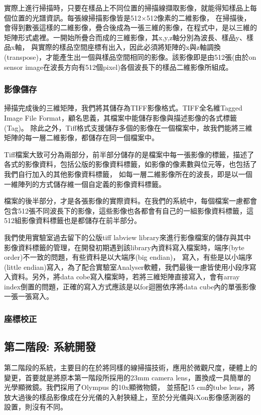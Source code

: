 \documentclass[12pt]{article}
\begin{document}
    實際上進行掃描時，只要在樣品上不同位置的掃描線擷取影像，就能得知樣品上每個位置的光譜資訊。每張線掃描影像皆是512$\times$512像素的二維影像，
    在掃描後，會得到數張這樣的二維影像，疊合後成為一張三維的影像，在程式中，是以三維的矩陣形式處裡。一開始所疊合而成的三維影像，其x,y,z軸分別為波長、樣品y、樣品x軸，
    與實際的樣品空間座標有出入，因此必須將矩陣的x與z軸調換(transpose)，才能產生出一個與樣品空間相同的影像。該影像即是由512張(由於on sensor image在波長方向有512個pixel)各個波長下的樣品二維影像所組成。

    \subsubsection{影像儲存}\label{section: saveTiff}
    掃描完成後的三維矩陣，我們將其儲存為TIFF影像格式。TIFF全名維Tagged Image File Format，顧名思義，其檔案中能儲存影像與描述影像的各式標籤(Tag)。
    除此之外，Tiff格式支援儲存多個的影像在一個檔案中，故我們能將三維矩陣的每一層二維影像，都儲存在同一個檔案中。

    Tiff檔案大致可分為兩部分，前半部分儲存的是檔案中每一張影像的標籤，描述了各式的影像資料，包括公版的影像資料標籤，如影像的像素數與位元等，也包括了我們自行加入的其他影像資料標籤，
    如每一層二維影像所在的波長，即是以一個一維陣列的方式儲存維一個自定義的影像資料標籤。

    檔案的後半部分，才是各張影像的實際資料。在我們的系統中，每個檔案一慮都會包含512張不同波長下的影像，這些影像也各都會有自己的一組影像資料標籤，這512組影像資料標籤也是都儲存在前半部分。

    我們使用實驗室過去留下的公版tiff labview library來進行影像檔案的儲存與其中影像資料標籤的管理，在開發初期遇到該library內資料寫入檔案時，端序(byte order)不一致的問題，有些資料是以大端序(big endian)，
    寫入，有些是以小端序(little endian)寫入，為了配合實驗室Analyser軟體，我們最後一慮皆使用小段序寫入資料。另外，將data cobe寫入檔案時，若將三維矩陣直接寫入，會有array index倒置的問題，正確的寫入方式應該是以for迴圈依序將data cube內的單張影像一張一張寫入。

    
    \subsubsection{座標校正}

    \subsection{第二階段: 系統開發}
    第二階段的系統，主要目的在於將同樣的線掃描技術，應用於微觀尺度，硬體上的變更，首要就是將原本第一階段所採用的23mm camera lens，置換成一具簡單的光學顯微鏡。我們採用了Olympus 的10x顯微物鏡，
    並搭配15 cm的tube lens，將放大過後的樣品影像成在分光儀的入射狹縫上，至於分光儀與iXon影像感測器的設置，則沒有不同。
\end{document}
